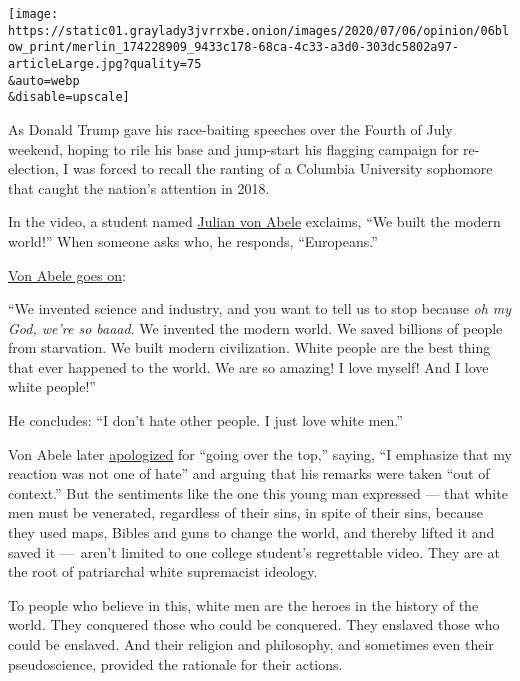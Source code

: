 \texttt{[image: https://static01.graylady3jvrrxbe.onion/images/2020/07/06/opinion/06blow\_print/merlin\_174228909\_9433c178-68ca-4c33-a3d0-303dc5802a97-articleLarge.jpg?quality=75\\\&auto=webp\\\&disable=upscale]}

As Donald Trump gave his race-baiting speeches over the Fourth of July
weekend, hoping to rile his base and jump-start his flagging campaign
for re-election, I was forced to recall the ranting of a Columbia
University sophomore that caught the nation's attention in 2018.

In the video, a student named
\href{https://www.columbiaspectator.com/news/2018/12/10/students-of-color-harassed-outside-butler-by-columbia-sophomore-spewing-racist-white-supremacist-rhetoric/}{Julian
von Abele} exclaims, ``We built the modern world!'' When someone asks
who, he responds, ``Europeans.''

\href{https://www.washingtonpost.com/nation/2018/12/11/were-white-men-we-did-everything-columbia-condemns-students-tirade-targeting-minorities/}{Von
Abele goes on}:

``We invented science and industry, and you want to tell us to stop
because \emph{oh my God, we're so baaad}. We invented the modern world.
We saved billions of people from starvation. We built modern
civilization. White people are the best thing that ever happened to the
world. We are so amazing! I love myself! And I love white people!''

He concludes: ``I don't hate other people. I just love white men.''

Von Abele later
\href{https://www.thedailybeast.com/columbia-student-from-viral-video-speaks-i-am-not-racist}{apologized}
for ``going over the top,'' saying, ``I emphasize that my reaction was
not one of hate'' and arguing that his remarks were taken ``out of
context.'' But the sentiments like the one this young man expressed ---
that white men must be venerated, regardless of their sins, in spite of
their sins, because they used maps, Bibles and guns to change the world,
and thereby lifted it and saved it ---~aren't limited to one college
student's regrettable video. They are at the root of patriarchal white
supremacist ideology.

To people who believe in this, white men are the heroes in the history
of the world. They conquered those who could be conquered. They enslaved
those who could be enslaved. And their religion and philosophy, and
sometimes even their pseudoscience, provided the rationale for their
actions.

